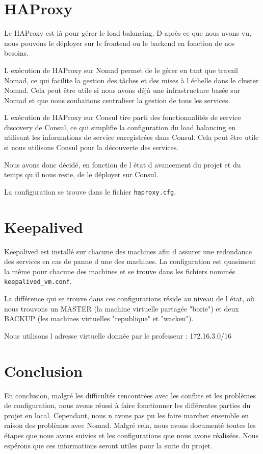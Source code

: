 \documentclass{report}
\begin{document}
\chapter{HAProxy}
Le HAProxy est là pour gérer le load balancing. D après ce que nous avons vu, nous pouvons le déployer sur le frontend ou le backend en fonction de nos besoins.

L exécution de HAProxy sur Nomad permet de le gérer en tant que travail Nomad, ce qui facilite la gestion des tâches et des mises à l échelle dans le cluster Nomad. Cela peut être utile si nous avons déjà une infrastructure basée sur Nomad et que nous souhaitons centraliser la gestion de tous les services.

L exécution de HAProxy sur Consul tire parti des fonctionnalités de service discovery de Consul, ce qui simplifie la configuration du load balancing en utilisant les informations de service enregistrées dans Consul. Cela peut être utile si nous utilisons Consul pour la découverte des services.

Nous avons donc décidé, en fonction de l état d avancement du projet et du temps qu il nous reste, de le déployer sur Consul.

La configuration se trouve dans le fichier \texttt{haproxy.cfg}.

\newpage

\chapter{Keepalived}
Keepalived est installé sur chacune des machines afin d assurer une redondance des services en cas de panne d une des machines. La configuration est quasiment la même pour chacune des machines et se trouve dans les fichiers nommés \texttt{keepalived\_vm.conf}.

La différence qui se trouve dans ces configurations réside au niveau de l état, où nous trouvons un MASTER (la machine virtuelle partagée "borie") et deux BACKUP (les machines virtuelles "republique" et "wacken").

Nous utilisons l adresse virtuelle donnée par le professeur : 172.16.3.0/16

\newpage

\chapter{Conclusion}
En conclusion, malgré les difficultés rencontrées avec les conflits et les problèmes de configuration, nous avons réussi à faire fonctionner les différentes parties du projet en local. Cependant, nous n avons pas pu les faire marcher ensemble en raison des problèmes avec Nomad. Malgré cela, nous avons documenté toutes les étapes que nous avons suivies et les configurations que nous avons réalisées. Nous espérons que ces informations seront utiles pour la suite du projet.
\end{document}
